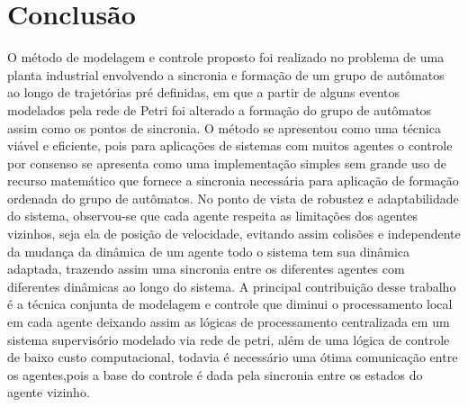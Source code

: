 \chapter{Conclusão}
\label{chap:conclusion}
O método de modelagem e controle proposto foi realizado no problema de uma planta industrial envolvendo a sincronia e formação de um grupo de autômatos ao longo de trajetórias pré definidas, em que a partir de alguns eventos modelados pela rede de Petri foi alterado a formação do grupo de autômatos assim como os pontos de sincronia.
O método se apresentou como uma técnica viável e eficiente, pois para aplicações de sistemas com muitos agentes o controle por consenso se apresenta como uma implementação simples sem grande uso de recurso matemático que fornece a sincronia necessária para aplicação de formação ordenada do grupo de autômatos.
No ponto de vista de robustez e adaptabilidade do sistema, observou-se que cada agente respeita as limitações dos agentes vizinhos, seja ela de posição de velocidade, evitando assim colisões e independente da mudança da dinâmica de um agente todo o sistema tem sua dinâmica adaptada, trazendo assim uma sincronia entre os diferentes agentes com diferentes dinâmicas ao longo do sistema.
A principal contribuição desse trabalho é a técnica conjunta de modelagem e controle que  diminui o processamento local em cada agente deixando assim as lógicas de processamento centralizada em um sistema supervisório modelado via rede de petri, além de uma lógica de controle de baixo custo computacional, todavia é necessário uma ótima comunicação entre os agentes,pois a base do controle é dada pela sincronia entre os estados do agente vizinho.
